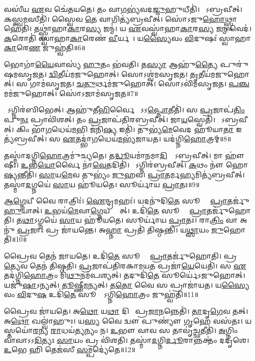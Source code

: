 𑌵𑌸𑍀॑𑌯 \ul{𑌏}𑌵 𑌚𑍇॑𑌤𑌯𑌤𑍇।
𑌤𑌂 𑌵𑌾\ul{𑌗}𑌭𑍍𑌯॑𑌵𑌦\ul{𑌜𑍍𑌜𑍁}𑌹𑍁𑌧𑍀𑌤𑌿॑।
𑌸𑍋᳚𑌽𑌬𑍍𑌰𑌵𑍀𑌤𑍍।
𑌕𑌸𑍍𑌤𑍍𑌵\ul{𑌮}𑌸𑍀𑌤𑌿॑।
𑌸𑍍𑌵𑍈𑌵 \ul{𑌤𑍇} 𑌵𑌾𑌗𑌿𑌤𑍍𑌯॑𑌬𑍍𑌰𑌵𑍀𑌤𑍍।
𑌸𑍋॑𑌽𑌜𑍁\ul{𑌹𑍋}𑌥𑍍𑌸𑍍𑌵𑌾𑌹𑍇𑌤𑌿॑।
𑌤𑌥𑍍𑌸𑍍𑌵𑌾॑𑌹𑌾\ul{𑌕𑌾}𑌰\ul{𑌸𑍍𑌯} 𑌜𑌨𑍍𑌮॑।
𑌯 \ul{𑌏}𑌵𑌸𑍍𑌵𑌾॑𑌹𑌾\ul{𑌕𑌾}𑌰\ul{𑌸𑍍𑌯} 𑌜\ul{𑌨𑍍𑌮} 𑌵𑍇𑌦॑।
\ul{𑌕}𑌰𑍋𑌤𑌿॑ 𑌸𑍍𑌵𑌾𑌹𑌾\ul{𑌕𑌾}𑌰𑍇𑌣॑ \ul{𑌵𑍀}𑌰𑍍𑌯𑌮𑍍᳚।
𑌯\ul{𑌸𑍍𑌯𑍈}𑌵𑌂 \ul{𑌵𑌿}𑌦𑍁𑌷𑌃॑ 𑌸𑍍𑌵𑌾𑌹𑌾\ul{𑌕𑌾}𑌰𑍇\ul{𑌣} 𑌜𑍁𑌹𑍍𑌵॑𑌤𑌿॥6॥

𑌭𑍋𑌗𑌾॑\ul{𑌯𑍈}𑌵𑌾𑌸𑍍𑌯॑ \ul{𑌹𑍁}𑌤𑌂 𑌭॑𑌵𑌤𑌿।
𑌤\ul{𑌸𑍍𑌯𑌾} 𑌆𑌹𑍁॑\ul{𑌤𑍍𑌯𑍈} 𑌪𑍁𑌰𑍁॑𑌷𑌮𑌸𑍃𑌜𑌤।
\ul{𑌦𑍍𑌵𑌿}𑌤𑍀𑌯॑𑌮𑌜𑍁𑌹𑍋𑌤𑍍।
𑌸𑍋𑌽𑌶𑍍𑌵॑𑌮𑌸𑍃𑌜𑌤।
\ul{𑌤𑍃}𑌤𑍀𑌯॑𑌮𑌜𑍁𑌹𑍋𑌤𑍍।
𑌸 𑌗𑌾𑌮॑𑌸𑍃𑌜𑌤।
\ul{𑌚}\ul{𑌤𑍁}𑌰𑍍𑌥𑌮॑𑌜𑍁𑌹𑍋𑌤𑍍।
𑌸𑍋𑌽𑌵𑌿॑𑌮𑌸𑍃𑌜𑌤।
\ul{𑌪}\ul{𑌞𑍍𑌚}𑌮𑌮॑𑌜𑍁𑌹𑍋𑌤𑍍।
𑌸𑍋॑𑌽𑌜𑌾𑌮॑𑌸𑍃𑌜𑌤॥7॥

𑌸𑍋᳚𑌽𑌗𑍍𑌨𑌿𑌰॑𑌬𑌿𑌭𑍇𑌤𑍍।
𑌆𑌹𑍁॑𑌤𑍀\ul{𑌭𑌿}𑌰𑍍𑌵𑍈 𑌮𑌾᳚\-𑌽𑌽\ul{𑌪𑍍𑌨𑍋}𑌤𑍀𑌤𑌿॑।
𑌸 \ul{𑌪𑍍𑌰}𑌜𑌾𑌪॑\ul{𑌤𑌿𑌂} 𑌪𑍁\ul{𑌨𑌃} 𑌪𑍍𑌰𑌾𑌵𑌿॑𑌶𑌤𑍍।
𑌤𑌂 \ul{𑌪𑍍𑌰}𑌜𑌾𑌪॑𑌤𑌿𑌰𑌬𑍍𑌰𑌵𑍀𑌤𑍍।
𑌜𑌾\ul{𑌯}𑌸𑍍𑌵𑍇𑌤𑌿॑।
𑌸𑍋᳚𑌽𑌬𑍍𑌰𑌵𑍀𑌤𑍍।
𑌕𑌿𑌂 𑌭𑌾॑\ul{𑌗}𑌧𑍇𑌯॑\ul{𑌮}𑌭𑌿 𑌜॑𑌨𑌿\ul{𑌷𑍍𑌯} 𑌇𑌤𑌿॑।
𑌤𑍁𑌭𑍍𑌯॑\ul{𑌮𑍇}𑌵𑍇𑌦 𑌹𑍂॑𑌯𑌾\ul{𑌤𑌾} 𑌇𑌤𑍍𑌯॑𑌬𑍍𑌰𑌵𑍀𑌤𑍍।
𑌸 \ul{𑌏}𑌤𑌦𑍍𑌭𑌾॑\ul{𑌗}𑌧𑍇𑌯॑\ul{𑌮}𑌭𑍍𑌯॑𑌜𑌾𑌯𑌤।
𑌯𑌦॑𑌗𑍍𑌨𑌿\ul{𑌹𑍋}𑌤𑍍𑌰𑌮𑍍॥8॥

𑌤𑌸𑍍𑌮𑌾॑𑌦𑌗𑍍𑌨𑌿\ul{𑌹𑍋}𑌤𑍍𑌰𑌮𑍁॑𑌚𑍍𑌯𑌤𑍇।
𑌤\ul{𑌦𑍍𑌧𑍂}𑌯𑌮𑌾॑𑌨𑌮𑌾\ul{𑌦𑌿}𑌤𑍍𑌯𑍋᳚\-𑌽𑌬𑍍𑌰𑌵𑍀𑌤𑍍।
𑌮𑌾 𑌹𑍗॑𑌷𑍀𑌃।
\ul{𑌉}𑌭\ul{𑌯𑍋}𑌰𑍍𑌵𑍈 𑌨𑌾॑\ul{𑌵𑍇}𑌤𑌦𑌿𑌤𑌿॑।
𑌸𑍋᳚𑌽𑌗𑍍𑌨𑌿𑌰॑𑌬𑍍𑌰𑌵𑍀𑌤𑍍।
\ul{𑌕}𑌥𑌂 𑌨𑍗॑ 𑌹𑍋\ul{𑌷𑍍𑌯}𑌨𑍍𑌤𑍀𑌤𑌿॑।
\ul{𑌸𑌾}𑌯\ul{𑌮𑍇}𑌵 𑌤𑍁𑌭𑍍𑌯𑌂॑ \ul{𑌜𑍁}𑌹𑌵\sn{}।
\ul{𑌪𑍍𑌰𑌾}𑌤𑌰𑍍𑌮\ul{𑌹𑍍𑌯}𑌮𑌿𑌤𑍍𑌯॑𑌬𑍍𑌰𑌵𑍀𑌤𑍍।
𑌤𑌸𑍍𑌮𑌾॑\ul{𑌦}𑌗𑍍𑌨𑌯𑍇॑ \ul{𑌸𑌾}𑌯 𑌹𑍂॑𑌯𑌤𑍇।
𑌸𑍂𑌰𑍍𑌯𑌾॑𑌯 \ul{𑌪𑍍𑌰𑌾}𑌤𑌃॥9॥

\ul{𑌆}\ul{𑌗𑍍𑌨𑍇}𑌯𑍀 𑌵𑍈 𑌰𑌾𑌤𑍍𑌰𑌿𑌃॑।
\ul{𑌐}𑌨𑍍𑌦𑍍𑌰𑌮𑌹𑌃॑।
𑌯𑌦𑌨𑍁॑𑌦𑌿\ul{𑌤𑍇} 𑌸𑍂𑌰𑍍𑌯𑍇᳚ \ul{𑌪𑍍𑌰𑌾}𑌤𑌰𑍍𑌜𑍁॑\ul{𑌹𑍁}𑌯𑌾𑌤𑍍।
\ul{𑌉}𑌭𑌯॑\ul{𑌮𑍇}𑌵𑌾\ul{𑌗𑍍𑌨𑍇}𑌯 𑌸𑍍𑌯𑌾᳚𑌤𑍍।
𑌉𑌦𑌿॑\ul{𑌤𑍇} 𑌸𑍂𑌰𑍍𑌯𑍇᳚ \ul{𑌪𑍍𑌰𑌾}𑌤𑌰𑍍𑌜𑍁॑𑌹𑍋𑌤𑌿।
𑌤\ul{𑌥𑌾}𑌽𑌗𑍍𑌨𑌯𑍇॑ \ul{𑌸𑌾}𑌯 𑌹𑍂॑𑌯𑌤𑍇।
𑌸𑍂𑌰𑍍𑌯𑌾॑𑌯 \ul{𑌪𑍍𑌰𑌾}𑌤𑌃।
𑌰𑌾\ul{𑌤𑍍𑌰𑌿𑌂} 𑌵𑌾 𑌅𑌨𑍁॑ \ul{𑌪𑍍𑌰}𑌜𑌾𑌃 𑌪𑍍𑌰 𑌜𑌾॑𑌯𑌨𑍍𑌤𑍇।
𑌅\ul{𑌹𑍍𑌨𑌾} 𑌪𑍍𑌰𑌤𑌿॑ 𑌤𑌿𑌷𑍍𑌠𑌨𑍍𑌤𑌿।
𑌯\ul{𑌥𑍍𑌸𑌾}𑌯𑌂 \ul{𑌜𑍁}𑌹𑍋𑌤𑌿॑॥10॥

𑌪𑍍𑌰𑍈𑌵 𑌤𑍇𑌨॑ 𑌜𑌾𑌯𑌤𑍇।
𑌉𑌦𑌿॑\ul{𑌤𑍇} 𑌸𑍂𑌰𑍍𑌯𑍇᳚ \ul{𑌪𑍍𑌰𑌾}𑌤𑌰𑍍𑌜𑍁॑𑌹𑍋𑌤𑌿।
𑌪𑍍𑌰\ul{𑌤𑍍𑌯𑍇}𑌵 𑌤𑍇𑌨॑ 𑌤𑌿𑌷𑍍𑌠𑌤𑌿।
\ul{𑌪𑍍𑌰}𑌜𑌾𑌪॑𑌤𑌿𑌰𑌕𑌾𑌮𑌯\ul{𑌤} 𑌪𑍍𑌰𑌜𑌾॑\ul{𑌯𑍇}𑌯𑍇𑌤𑌿॑।
𑌸 \ul{𑌏}𑌤𑌦॑𑌗𑍍𑌨𑌿\ul{𑌹𑍋}𑌤𑍍𑌰𑌂 𑌮𑌿॑\ul{𑌥𑍁}𑌨𑌮॑𑌪𑌶𑍍𑌯𑌤𑍍।
𑌤𑌦𑍁𑌦𑌿॑\ul{𑌤𑍇} 𑌸𑍂𑌰𑍍𑌯𑍇॑\-𑌽𑌜𑍁𑌹𑍋𑌤𑍍।
𑌯𑌜𑍁॑\ul{𑌷𑌾}\-𑌽𑌨𑍍𑌯𑌤𑍍।
\ul{𑌤𑍂}𑌷𑍍𑌣𑍀\ul{𑌮}𑌨𑍍𑌯𑌤𑍍।
𑌤\ul{𑌤𑍋} 𑌵𑍈 𑌸 𑌪𑍍𑌰𑌾𑌜𑌾॑𑌯𑌤।
𑌯\ul{𑌸𑍍𑌯𑍈}𑌵𑌂 \ul{𑌵𑌿}𑌦𑍁\ul{𑌷} 𑌉𑌦𑌿॑\ul{𑌤𑍇} 𑌸𑍂𑌰𑍍𑌯𑍇᳚\-𑌽𑌗𑍍𑌨𑌿\ul{𑌹𑍋}𑌤𑍍𑌰𑌂 𑌜𑍁𑌹𑍍𑌵॑𑌤𑌿॥11॥

𑌪𑍍𑌰𑍈𑌵 𑌜𑌾॑𑌯𑌤𑍇।
𑌅\ul{𑌥𑍋} 𑌯\ul{𑌥𑌾} 𑌦𑌿𑌵𑌾᳚ 𑌪𑍍𑌰\ul{𑌜𑌾}𑌨𑌨𑍍𑌨𑍇𑌤𑌿॑।
\ul{𑌤𑌾}𑌦𑍃\ul{𑌗𑍇}𑌵 𑌤𑌤𑍍।
𑌅\ul{𑌥𑍋} 𑌖𑌲𑍍𑌵𑌾॑𑌹𑍁𑌃।
𑌯\ul{𑌸𑍍𑌯} 𑌵𑍈 𑌦𑍍𑌵𑍗 𑌪𑍁𑌣𑍍𑌯𑍗॑ \ul{𑌗𑍃}𑌹𑍇 𑌵𑌸॑𑌤𑌃।
𑌯𑌸𑍍𑌤𑌯𑍋॑\ul{𑌰}𑌨𑍍𑌯 \ul{𑌰𑌾}𑌧𑌯॑\ul{𑌤𑍍𑌯}𑌨𑍍𑌯𑌂 𑌨।
\ul{𑌉}𑌭𑍗 𑌵𑌾𑌵 𑌸 𑌤𑌾𑌵𑍃॑\ul{𑌚𑍍𑌛}𑌤𑍀𑌤𑌿॑।
\ul{𑌅}𑌗𑍍𑌨𑌿𑌂 𑌵𑌾𑌵𑌾\-𑌽𑌽\ul{𑌦𑌿}𑌤𑍍𑌯𑌃 \ul{𑌸𑌾}𑌯𑌂 𑌪𑍍𑌰 𑌵𑌿॑𑌶𑌤𑌿।
𑌤𑌸𑍍𑌮𑌾॑\ul{𑌦}𑌗𑍍𑌨𑌿\ul{𑌰𑍍𑌦𑍂}𑌰𑌾𑌨𑍍𑌨𑌕𑍍𑌤𑌂॑ 𑌦𑌦𑍃𑌶𑍇।
\ul{𑌉}𑌭𑍇 𑌹𑌿 𑌤𑍇𑌜॑𑌸𑍀 \ul{𑌸}𑌮𑍍𑌪𑌦𑍍𑌯𑍇॑𑌤𑍇॥12॥

